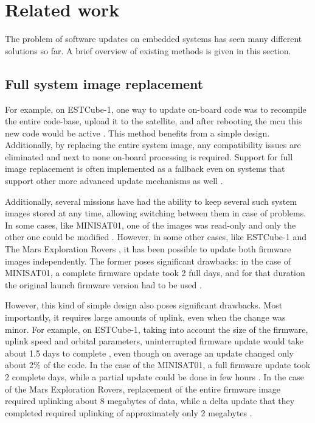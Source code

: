 \newpage
\section{Related work}
\label{s:relatedwork}

The problem
of software updates on embedded systems has seen many different solutions so far. A brief overview of existing methods is given in this section.

\subsection{Full system image replacement}

For example, on ESTCube-1, one way to update on-board code was to recompile the entire code-base, upload it to the satellite, and after rebooting the \gls{mcu} this new code would be active \cite{Suenter2016}. This method benefits from a simple design. Additionally, by replacing the entire system image, any compatibility issues are eliminated and next to none on-board processing is required. Support for full image replacement is often implemented as a fallback even on systems that support other more advanced update mechanisms as well \cite{Tarbe2013,Greco2005,Garrido1998}.

Additionally, several missions have had the ability to keep several such system images stored at any time, allowing switching between them in case of problems. In some cases, like MINISAT01, one of the images was read-only and only the other one could be modified \cite{Garrido1998}. However, in some other cases, like  ESTCube-1 \cite{Tarbe2013} and The Mars Exploration Rovers \cite{Greco2005}, it has been possible to update both firmware images independently. The former poses significant drawbacks: in the case of MINISAT01, a complete firmware update took 2 full days, and for that duration the original launch firmware version had to be used \cite{Garrido1998}.

However, this kind of simple design also poses significant drawbacks. Most importantly, it requires large amounts of uplink, even when the change was minor. For example, on ESTCube-1, taking into account the size of the firmware, uplink speed and orbital parameters, uninterrupted firmware update would take about 1.5 days to complete \cite{Suenter2014}, even though on average an update changed only about 2\% of the code. In the case of the MINISAT01, a full firmware update took 2 complete days, while a partial update could be done in few hours \cite{Garrido1998}. In the case of the Mars Exploration Rovers, replacement of the entire firmware image required uplinking about 8 megabytes of data, while a delta update that they completed required uplinking of approximately only 2 megabytes \cite{Greco2005}.

